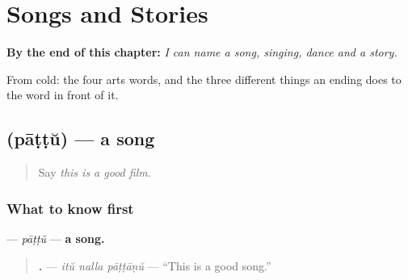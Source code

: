
\chapter{Songs and Stories}
\label{ch:ml-arts}

\begin{chapteropening}
\textbf{By the end of this chapter:} \emph{I can name a song, singing, dance and a story.}

From cold: the four arts words, and the three different things an ending does to the word in front of it.
\end{chapteropening}

\section[\texorpdfstring{\ml{പാട്ട്} (pāṭṭŭ)}{പാട്ട് (pāṭṭŭ)}]{ (pāṭṭŭ) — a song}

\label{lesson:ML-C99-paattu}



\begin{quote}
Say \emph{this is a good film}.
\end{quote}

\subsection*{What to know first}
\textbf{} — \emph{pāṭṭŭ} — \textbf{a song.}

\begin{quote}
\textbf{  .} — \emph{itŭ nalla pāṭṭāṇŭ} — \textquotedblleft{}This is a good song.\textquotedblright{}
\end{quote}

